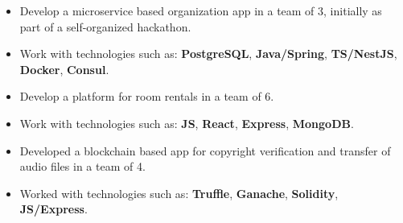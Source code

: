 \documentclass[11pt,a4paper]{altacv}
\begin{document}
\begin{comment}
\divider 
\cvevent{Animator \& Promoter}{Green Velo}{08.09.2017 - 10.09.2017}{Lviv, Ukraine}
\begin{itemize}
\item Promoted the Eastern European cross country bicycle trail during the 2017 Polish-Ukrainian Partnership Festival.
\item Cooperated in a team of over 20 people.
\item Mentored organized meetings and coordinated events.
\end{itemize}
\end{comment}
\begin{itemize}
    \item Develop a microservice based organization app in a team of 3, initially as part of a self-organized hackathon.
    \item Work with technologies such as: \textbf{PostgreSQL}, \textbf{Java/Spring}, \textbf{TS/NestJS}, \textbf{Docker}, \textbf{Consul}.
\end{itemize}
\vspace{-0.15cm}
\divider

\begin{itemize}
    \item Develop a platform for room rentals in a team of 6.
    \item Work with technologies such as: \textbf{JS}, \textbf{React}, \textbf{Express}, \textbf{MongoDB}.
\end{itemize}
\vspace{-0.15cm}
\divider

\begin{itemize}
    \item Developed a blockchain based app for copyright verification and transfer of audio files in a team of 4.
    \item Worked with technologies such as: \textbf{Truffle}, \textbf{Ganache}, \textbf{Solidity}, \textbf{JS/Express}.
\end{itemize}
\end{document}
